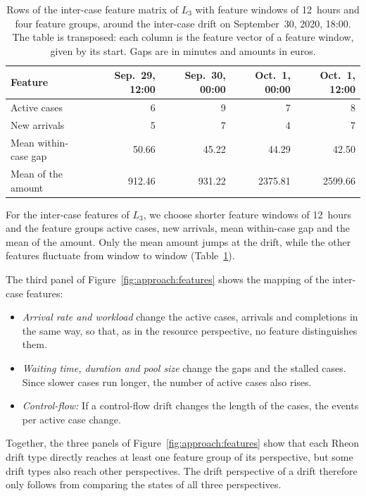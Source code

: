 \begin{table}[tb]
	\centering
	\caption[Inter-case feature vectors of the running example]{%
		Rows of the inter-case feature matrix of $L_3$ with feature windows of 12~hours and four feature groups, around the inter-case drift on September~30, 2020, 18:00. The table is transposed: each column is the feature vector of a feature window, given by its start. Gaps are in minutes and amounts in euros.}
	\label{tab:approach:features_inter}
	\small
	\begin{tabular}{@{}lrrrr@{}}
		\toprule
		Feature              & Sep.~29, 12:00 & Sep.~30, 00:00 & Oct.~1, 00:00 & Oct.~1, 12:00 \\
		\midrule
		Active cases         & 6              & 9              & 7             & 8             \\
		New arrivals         & 5              & 7              & 4             & 7             \\
		Mean within-case gap & 50.66          & 45.22          & 44.29         & 42.50         \\
		Mean of the amount   & 912.46         & 931.22         & 2375.81       & 2599.66       \\
		\bottomrule
	\end{tabular}
\end{table}

\begin{example}
	\label{ex:approach:inter}
	For the inter-case features of $L_3$, we choose shorter feature windows of 12~hours and the feature groups active cases, new arrivals, mean within-case gap and the mean of the amount. Only the mean amount jumps at the drift, while the other features fluctuate from window to window (Table~\ref{tab:approach:features_inter}).
\end{example}

The third panel of Figure~\ref{fig:approach:features} shows the mapping of the inter-case features:
\begin{itemize}
	\item \emph{Arrival rate and workload} change the active cases, arrivals and completions in the same way, so that, as in the resource perspective, no feature distinguishes them.
	\item \emph{Waiting time, duration and pool size} change the gaps and the stalled cases. Since slower cases run longer, the number of active cases also rises.
	\item \emph{Control-flow:} If a control-flow drift changes the length of the cases, the events per active case change.
\end{itemize}
Together, the three panels of Figure~\ref{fig:approach:features} show that each Rheon drift type directly reaches at least one feature group of its perspective, but some drift types also reach other perspectives. The drift perspective of a drift therefore only follows from comparing the states of all three perspectives.

